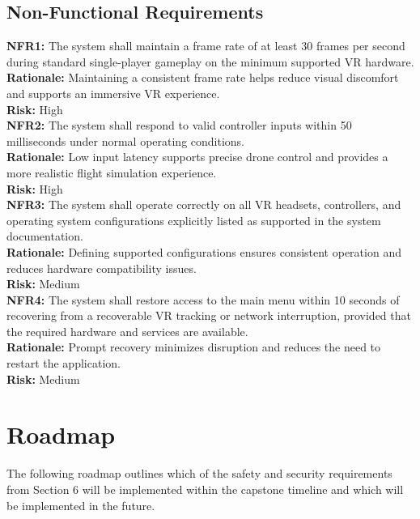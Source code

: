 \documentclass{article}
\newcommand{\reqdef}[1]{\textbf{#1:}}
\begin{document}
\subsection{Non-Functional Requirements}
\noindent
\reqdef{NFR1} The system shall maintain a frame rate of at least 30 frames per second during standard single-player gameplay on the minimum supported VR hardware.\\
\textbf{Rationale:} Maintaining a consistent frame rate helps reduce visual discomfort and supports an immersive VR experience.\\
\textbf{Risk:} High\\[1em]

\noindent
\reqdef{NFR2} The system shall respond to valid controller inputs within 50 milliseconds under normal operating conditions.\\
\textbf{Rationale:} Low input latency supports precise drone control and provides a more realistic flight simulation experience.\\
\textbf{Risk:} High\\[1em]


\noindent
\reqdef{NFR3} The system shall operate correctly on all VR headsets, controllers, and operating system configurations explicitly listed as supported in the system documentation.\\
\textbf{Rationale:} Defining supported configurations ensures consistent operation and reduces hardware compatibility issues.\\
\textbf{Risk:} Medium\\[1em]


\noindent
\reqdef{NFR4} The system shall restore access to the main menu within 10 seconds of recovering from a recoverable VR tracking or network interruption, provided that the required hardware and services are available.\\
\textbf{Rationale:} Prompt recovery minimizes disruption and reduces the need to restart the application.\\
\textbf{Risk:} Medium


\section{Roadmap}\label{sec:roadmap}

The following roadmap outlines which of the safety and security requirements
from Section 6 will be implemented within the capstone timeline and which will
be implemented in the future.
\end{document}
